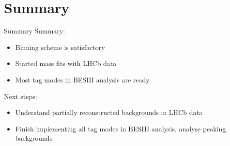 \documentclass{beamer}
\begin{document}
\section{Summary}
\begin{frame}{Summary}
  Summary:
  \begin{itemize}
    \item{Binning scheme is satisfactory}
    \item{Started mass fits with LHCb data}
    \item{Most tag modes in BESIII analysis are ready}
  \end{itemize}
  Next steps:
  \begin{itemize}
    \item{Understand partially reconstructed backgrounds in LHCb data}
    \item{Finish implementing all tag modes in BESIII analysis, analyse peaking backgrounds}
  \end{itemize}
\end{frame}




\end{document}
